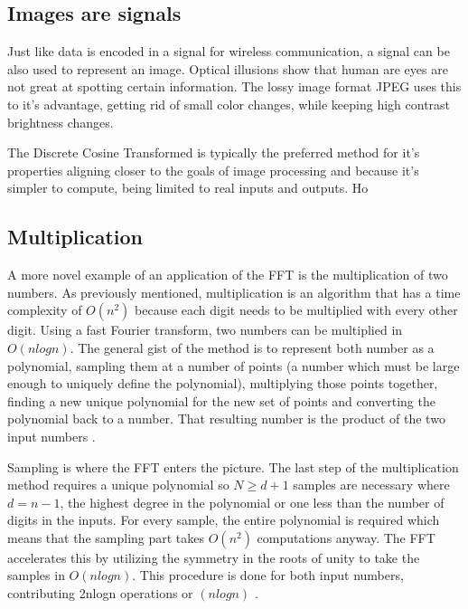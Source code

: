 
\subsection{Images are signals}
Just like data is encoded in a signal for wireless communication, a signal can be also used to represent an image. Optical illusions show that human are eyes are not great at spotting certain information. The lossy image format JPEG uses this to it's advantage, getting rid of small color changes, while keeping high contrast brightness changes.  

The Discrete Cosine Transformed is typically the preferred method for it's properties aligning closer to the goals of image processing and because it's simpler to compute, being limited to real inputs and outputs. Ho

\subsection{Multiplication}
A more novel example of an application of the FFT is the multiplication of two numbers. As previously mentioned, multiplication is an algorithm that has a time complexity of $O(n^2)$ because each digit needs to be multiplied with every other digit. Using a fast Fourier transform, two numbers can be multiplied in $O(nlogn)$. The general gist of the method is to represent both number as a polynomial, sampling them at a number of points (a number which must be large enough to uniquely define the polynomial), multiplying those points together, finding a new unique polynomial for the new set of points and converting the polynomial back to a number. That resulting number is the product of the two input numbers \cite{Reducible2020}.

Sampling is where the FFT enters the picture. The last step of the multiplication method requires a unique polynomial so $N \geq d+1$ samples are necessary where $d = n-1$, the highest degree in the polynomial or one less than the number of digits in the inputs. For every sample, the entire polynomial is required which means that the sampling part takes $O(n^2)$ computations anyway. The FFT accelerates this by utilizing the symmetry in the roots of unity to take the samples in $O(nlogn)$. This procedure is done for both input numbers, contributing 2nlogn operations or $(nlogn)$ \cite{Reducible2020}.

